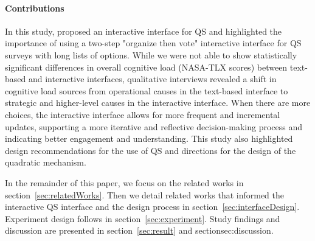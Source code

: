 \paragraph{Contributions}
In this study, proposed an interactive interface for QS and highlighted the importance of using a two-step "organize then vote" interactive interface for QS surveys with long lists of options. While we were not able to show statistically significant differences in overall cognitive load (NASA-TLX scores) between text-based and interactive interfaces, qualitative interviews revealed a shift in cognitive load sources from operational causes in the text-based interface to strategic and higher-level causes in the interactive interface. When there are more choices, the interactive interface allows for more frequent and incremental updates, supporting a more iterative and reflective decision-making process and indicating better engagement and understanding. This study also highlighted design recommendations for the use of QS and directions for the design of the quadratic mechanism. 

In the remainder of this paper, we focus on the related works in section~\ref{sec:relatedWorks}. Then we detail related works that informed the interactive QS interface and the design process in section~\ref{sec:interfaceDesign}. Experiment design follows in section~\ref{sec:experiment}. Study findings and discussion are presented in section~\ref{sec:result} and section{sec:discussion}. 


